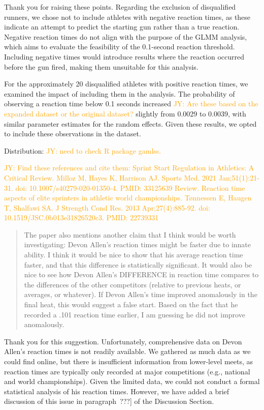 \documentclass[12pt]{article}
\newcommand{\jy}[1]{\textcolor{orange}{JY: #1}}
\newenvironment{comment}%
{\begin{quotation}\noindent\small\it\color{darkblue}\ignorespaces%
}{\end{quotation}}
\begin{document}
Thank you for raising these points. Regarding the exclusion of
disqualified runners, we chose not to include athletes with negative
reaction times, as these indicate an attempt to predict the starting
gun rather than a true reaction. Negative reaction times do not align
with the purpose of the GLMM analysis, which aims to evaluate the
feasibility of the 0.1-second reaction threshold. Including negative
times would introduce results where the reaction occurred before the
gun fired, making them unsuitable for this analysis.


For the approximately 20 disqualified athletes with positive reaction
times, we examined the impact of including them in the analysis. The
probability of observing a reaction time below 0.1 seconds increased
\jy{Are these based on the expanded dataset or the original dataset?}
slightly from 0.0029 to 0.0039, with similar parameter estimates for
the random effects. Given these results, we opted to include these
observations in the dataset.


Distribution: \jy{need to check R package gamlss.}


\jy{Find these references and cite them:
Sprint Start Regulation in Athletics: A Critical Review.
Milloz M, Hayes K, Harrison AJ.
Sports Med. 2021 Jan;51(1):21-31. doi: 10.1007/s40279-020-01350-4.
PMID: 33125639 Review.
Reaction time aspects of elite sprinters in athletic world championships.
Tønnessen E, Haugen T, Shalfawi SA.
J Strength Cond Res. 2013 Apr;27(4):885-92. doi: 10.1519/JSC.0b013e31826520c3.
PMID: 22739331
}

\begin{comment}
The paper also mentions another claim that I think would be worth investigating:
Devon Allen’s reaction times might be faster due to innate ability. I think it
would be nice to show that his average reaction time faster, and that this
difference is statistically significant. It would also be nice to see how Devon
Allen’s DIFFERENCE in reaction time compares to the differences of the other
competitors (relative to previous heats, or averages, or whatever). If Devon
Allen’s time improved anomalously in the final heat, this would suggest a false
start. Based on the fact that he recorded a .101 reaction time earlier, I am
guessing he did not improve anomalously.  
\end{comment}

Thank you for this suggestion. Unfortunately, comprehensive data on
Devon Allen's reaction times is not readily available. We gathered as
much data as we could find online, but there is insufficient
information from lower-level meets, as reaction times are typically
only recorded at major competitions (e.g., national and world
championships). Given the limited data, we could not conduct a formal
statistical analysis of his reaction times. However, we have added a
brief discussion of this issue in paragraph~???] of the Discussion Section.
\end{document}
